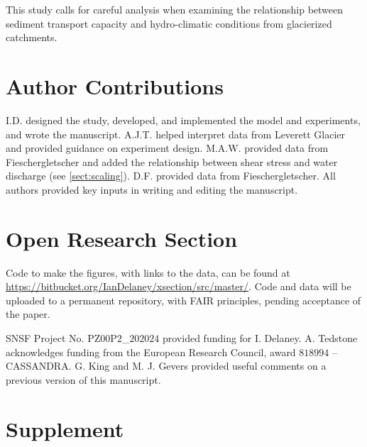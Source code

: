 \documentclass[draft]{agujournal2019}
\begin{document}
This study calls for careful analysis when examining the relationship between sediment transport capacity and hydro-climatic conditions from glacierized catchments.

\section*{Author Contributions}

I.D. designed the study, developed, and implemented the model and experiments, and wrote the manuscript.
A.J.T. helped interpret data from Leverett Glacier and provided guidance on experiment design.
M.A.W. provided data from Fieschergletscher and added the relationship between shear stress and water discharge (see \ref{sect:scaling}).
D.F. provided data from Fieschergletscher.
All authors provided key inputs in writing and editing the manuscript.


\section*{Open Research Section}

Code to make the figures, with links to the data, can be found at \url{https://bitbucket.org/IanDelaney/xsection/src/master/}.
Code and data will be uploaded to a permanent repository, with FAIR principles, pending acceptance of the paper.

\acknowledgments

SNSF Project No. $\mathrm{PZ00P2}$\_$202024$ provided  funding for I. Delaney.
A. Tedstone acknowledges funding from the European Research Council, award $818994$ -- CASSANDRA.
G. King and M. J. Gevers provided useful comments on a previous version of this manuscript.



\newpage

\section{Supplement}
\end{document}
